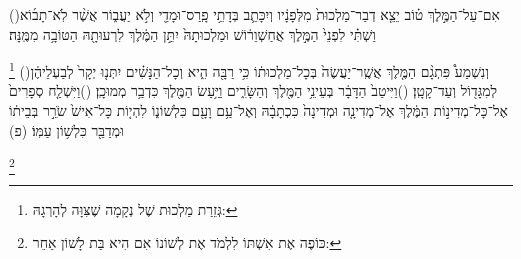 \documentclass[12pt, openany]{book}
\newcommand{\footnotecomment}[1]{
	\renewcommand\thefootnote{}
	\footnote{\textsf{#1}}}
\newcommand{\commenta}[1]{\footnotecomment{#1}\hspace{0em}}
\newcommand{\vsnum}[1]{(\hebrewnumeral{#1})\space}
\begin{document}
{\vsnum{19}אִם־עַל־הַמֶּ֣לֶךְ ט֗וֹב יֵצֵ֤א דְבַר־מַלְכוּת֙ מִלְּפָנָ֔יו וְיִכָּתֵ֛ב בְּדָתֵ֥י פָֽרַס־וּמָדַ֖י וְלֹ֣א יַעֲב֑וֹר אֲשֶׁ֨ר לֹֽא־תָב֜וֹא וַשְׁתִּ֗י לִפְנֵי֙ הַמֶּ֣לֶךְ אֲחַשְׁוֵר֔וֹשׁ וּמַלְכוּתָהּ֙ יִתֵּ֣ן הַמֶּ֔לֶךְ לִרְעוּתָ֖הּ הַטּוֹבָ֥ה מִמֶּֽנָּה׃%
\commenta{ גְּזֵרַת מַלְכוּת שֶׁל נְקָמָה שֶׁצִּוָּה לְהָרְגָהּ:}%
\vsnum{20}וְנִשְׁמַע֩ פִּתְגָ֨ם הַמֶּ֤לֶךְ אֲשֶֽׁר־יַעֲשֶׂה֙ בְּכָל־מַלְכוּת֔וֹ כִּ֥י רַבָּ֖ה הִ֑יא וְכָל־הַנָּשִׁ֗ים יִתְּנ֤וּ יְקָר֙ לְבַעְלֵיהֶ֔ן לְמִגָּד֖וֹל וְעַד־קָטָֽן׃
\vsnum{21}וַיִּיטַב֙ הַדָּבָ֔ר בְּעֵינֵ֥י הַמֶּ֖לֶךְ וְהַשָּׂרִ֑ים וַיַּ֥עַשׂ הַמֶּ֖לֶךְ כִּדְבַ֥ר מְמוּכָֽן׃
\vsnum{22}וַיִּשְׁלַ֤ח סְפָרִים֙ אֶל־כָּל־מְדִינ֣וֹת הַמֶּ֔לֶךְ אֶל־מְדִינָ֤ה וּמְדִינָה֙ כִּכְתָבָ֔הּ וְאֶל־עַ֥ם וָעָ֖ם כִּלְשׁוֹנ֑וֹ לִהְי֤וֹת כָּל־אִישׁ֙ שֹׂרֵ֣ר בְּבֵית֔וֹ וּמְדַבֵּ֖ר כִּלְשׁ֥וֹן עַמּֽוֹ׃ (פ)%
\commenta{ כּוֹפֶה אֶת אִשְׁתּוֹ לִלְמֹד אֶת לְשׁוֹנוֹ אִם הִיא בַּת לָשׁוֹן אַחֵר:}%
\clearpage}
\end{document}
